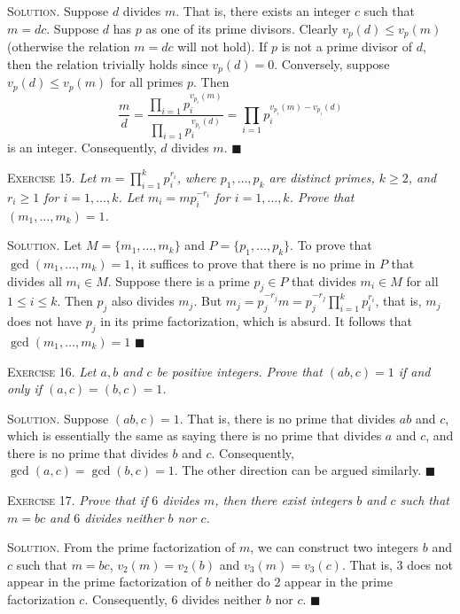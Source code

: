 \documentclass[11pt, leqno]{article}
\newcommand{\done}{\ensuremath{\blacksquare}}
\begin{document}
\textsc{Solution}. Suppose $d$ divides $m$. That is, there exists an integer $c$ such that $m = dc$. Suppose $d$ has $p$ as one of its prime divisors. Clearly $v_p(d) \leq v_p(m)$ (otherwise the relation $m=dc$ will not hold). If $p$ is not a prime divisor of $d$, then the relation trivially holds since $v_p(d) = 0$. Conversely, suppose $v_p(d) \leq v_p(m)$ for all primes $p$. Then 
\begin{displaymath}
\frac{m}{d} = \frac{\prod_{i=1}p_i^{v_{p_i}(m)}}{\prod_{i=1}p_i^{v_{p_i}(d)}} = \prod_{i=1} p_i^{v_{p_i}(m)-v_{p_i}(d)}
\end{displaymath}
is an integer. Consequently, $d$ divides $m$. \done

\textsc{Exercise 15}. \emph{Let $m = \prod_{i=1}^k p_i^{r_i}$, where $p_1, \ldots, p_k$ are distinct primes, $k \geq 2$, and $r_i\geq 1$ for $i=1,\ldots, k$. Let $m_i = mp_i^{-r_i}$ for $i=1,\ldots, k$. Prove that $(m_1, \ldots, m_k) = 1$.}

\textsc{Solution}. Let $M=\{m_1, \ldots, m_k\}$ and $P=\{ p_1, \ldots, p_k\}$. To prove that $\gcd(m_1, \ldots, m_k) = 1$, it suffices to prove that there is no prime in $P$ that divides all $m_i \in M$. Suppose there is a prime $p_j \in P$ that divides $m_i \in M$ for all $1\leq i \leq k$. Then $p_j$ also divides $m_j$. But $m_j = p_j^{-r_j}m = p_j^{-r_j} \prod_{i=1}^k p_i^{r_i} $, that is, $m_j$ does not have $p_j$ in its prime factorization, which is absurd. It follows that $\gcd(m_1, \ldots, m_k) = 1$ \done

\textsc{Exercise 16}. \emph{Let $a, b$ and $c$ be positive integers. Prove that $(ab, c)=1$ if and only if $(a,c) = (b,c) = 1$.}

\textsc{Solution}. Suppose $(ab, c) = 1$. That is, there is no prime that divides $ab$ and $c$, which is essentially the same as saying there is no prime that divides $a$ and $c$, and there is no prime that divides $b$ and $c$. Consequently, $\gcd(a,c) = \gcd(b,c) = 1$. The other direction can be argued similarly. \done

\textsc{Exercise 17}. \emph{Prove that if $6$ divides $m$, then there exist integers $b$ and $c$ such that $m=bc$ and $6$ divides neither $b$ nor $c$.}

\textsc{Solution}. From the prime factorization of $m$, we can construct two integers $b$ and $c$ such that $m=bc$, $v_2(m) = v_2(b)$ and $v_3(m) = v_3(c)$. That is, $3$ does not appear in the prime factorization of $b$ neither do $2$ appear in the prime factorization $c$. Consequently, $6$ divides neither $b$ nor $c$. \done
\end{document}
